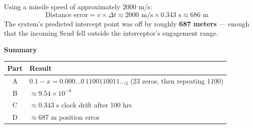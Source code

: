 \documentclass{article}
\begin{document}
\begin{flushleft}
    \smallskip
    \noindent Using a missile speed of approximately $2000$ m/s:
    \[
        \text{Distance error} = v \times \Delta t \approx 2000 \text{ m/s} \times 0.343 \text{ s}
        \approx 686 \text{ m}
    \]
    The system's predicted intercept point was off by roughly
    \textbf{687 meters} --- enough that the incoming Scud fell outside the
    interceptor's engagement range.

    \bigskip
    \noindent \textbf{Summary}

    \begin{center}
        \begin{tabular}{@{}cl@{}}
            \toprule
            Part & Result \\
            \midrule
            A & $0.1-x = 0.000\ldots0\,1100110011\ldots_2$ (23 zeros, then repeating $1100$) \\
            B & $\approx 9.54\times10^{-8}$ \\
            C & $\approx 0.343$ s clock drift after 100 hrs \\
            D & $\approx 687$ m position error \\
            \bottomrule
        \end{tabular}
    \end{center}

\end{flushleft}
\end{document}
